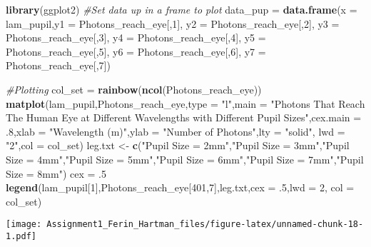 \documentclass[]{article}
\newenvironment{Shaded}{\begin{snugshade}}{\end{snugshade}}
\newcommand{\KeywordTok}[1]{\textcolor[rgb]{0.13,0.29,0.53}{\textbf{#1}}}
\newcommand{\DataTypeTok}[1]{\textcolor[rgb]{0.13,0.29,0.53}{#1}}
\newcommand{\DecValTok}[1]{\textcolor[rgb]{0.00,0.00,0.81}{#1}}
\newcommand{\StringTok}[1]{\textcolor[rgb]{0.31,0.60,0.02}{#1}}
\newcommand{\CommentTok}[1]{\textcolor[rgb]{0.56,0.35,0.01}{\textit{#1}}}
\newcommand{\NormalTok}[1]{#1}
\begin{document}
\begin{Shaded}
\begin{Highlighting}[]
\KeywordTok{library}\NormalTok{(ggplot2)}
\CommentTok{#Set data up in a frame to plot}
\NormalTok{data_pup =}\StringTok{ }\KeywordTok{data.frame}\NormalTok{(}\DataTypeTok{x =}\NormalTok{ lam_pupil,}\DataTypeTok{y1 =}\NormalTok{ Photons_reach_eye[,}\DecValTok{1}\NormalTok{], }\DataTypeTok{y2 =}\NormalTok{ Photons_reach_eye[,}\DecValTok{2}\NormalTok{], }\DataTypeTok{y3 =}\NormalTok{ Photons_reach_eye[,}\DecValTok{3}\NormalTok{], }\DataTypeTok{y4 =}\NormalTok{ Photons_reach_eye[,}\DecValTok{4}\NormalTok{], }\DataTypeTok{y5 =}\NormalTok{ Photons_reach_eye[,}\DecValTok{5}\NormalTok{], }\DataTypeTok{y6 =}\NormalTok{ Photons_reach_eye[,}\DecValTok{6}\NormalTok{], }\DataTypeTok{y7 =}\NormalTok{ Photons_reach_eye[,}\DecValTok{7}\NormalTok{])}

\CommentTok{#Plotting }
\NormalTok{col_set =}\StringTok{ }\KeywordTok{rainbow}\NormalTok{(}\KeywordTok{ncol}\NormalTok{(Photons_reach_eye))}
\KeywordTok{matplot}\NormalTok{(lam_pupil,Photons_reach_eye,}\DataTypeTok{type =} \StringTok{"l"}\NormalTok{,}\DataTypeTok{main =} \StringTok{"Photons That Reach The Human Eye at Different Wavelengths with Different Pupil Sizes"}\NormalTok{,}\DataTypeTok{cex.main =}\NormalTok{ .}\DecValTok{8}\NormalTok{,}\DataTypeTok{xlab =} \StringTok{"Wavelength (m)"}\NormalTok{,}\DataTypeTok{ylab =} \StringTok{"Number of Photons"}\NormalTok{,}\DataTypeTok{lty =} \StringTok{"solid"}\NormalTok{, }\DataTypeTok{lwd =} \StringTok{"2"}\NormalTok{,}\DataTypeTok{col =}\NormalTok{ col_set)}
\NormalTok{leg.txt <-}\StringTok{ }\KeywordTok{c}\NormalTok{(}\StringTok{"Pupil Size = 2mm"}\NormalTok{,}\StringTok{"Pupil Size = 3mm"}\NormalTok{,}\StringTok{"Pupil Size = 4mm"}\NormalTok{,}\StringTok{"Pupil Size = 5mm"}\NormalTok{,}\StringTok{"Pupil Size = 6mm"}\NormalTok{,}\StringTok{"Pupil Size = 7mm"}\NormalTok{,}\StringTok{"Pupil Size = 8mm"}\NormalTok{)}
\NormalTok{cex =}\StringTok{ }\NormalTok{.}\DecValTok{5}
\KeywordTok{legend}\NormalTok{(lam_pupil[}\DecValTok{1}\NormalTok{],Photons_reach_eye[}\DecValTok{401}\NormalTok{,}\DecValTok{7}\NormalTok{],leg.txt,}\DataTypeTok{cex =}\NormalTok{ .}\DecValTok{5}\NormalTok{,}\DataTypeTok{lwd =} \DecValTok{2}\NormalTok{, }\DataTypeTok{col =}\NormalTok{ col_set)}
\end{Highlighting}
\end{Shaded}

\texttt{[image: Assignment1\_Ferin\_Hartman\_files/figure-latex/unnamed-chunk-18-1.pdf]}
\end{document}
